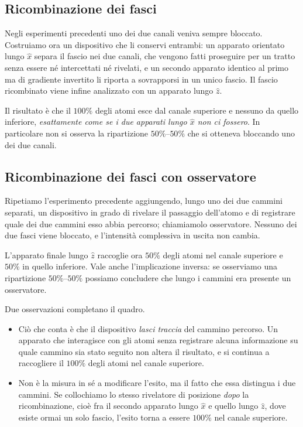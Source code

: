  
\subsection{Ricombinazione dei fasci}
 
Negli esperimenti precedenti uno dei due canali veniva sempre bloccato.
Costruiamo ora un dispositivo che li conservi entrambi: un apparato orientato lungo $\hat{x}$ separa il fascio nei due canali, che vengono fatti proseguire per un tratto senza essere né intercettati né rivelati, e un secondo apparato identico al primo ma di gradiente invertito li riporta a sovrapporsi in un unico fascio. 
Il fascio ricombinato viene infine analizzato con un apparato lungo $\hat{z}$.
 
Il risultato è che il $100\%$ degli atomi esce dal canale superiore e nessuno da quello inferiore, \emph{esattamente come se i due apparati lungo $\hat{x}$ non ci fossero}. 
In particolare non si osserva la ripartizione $50\%$--$50\%$ che si otteneva bloccando uno dei due canali.
 
\subsection{Ricombinazione dei fasci con osservatore}
 
Ripetiamo l'esperimento precedente aggiungendo, lungo uno dei due cammini separati, un dispositivo in grado di rivelare il passaggio dell'atomo e di registrare quale dei due cammini esso abbia percorso; chiamiamolo osservatore. Nessuno dei due fasci viene bloccato, e l'intensità complessiva in uscita non cambia.
 
L'apparato finale lungo $\hat{z}$ raccoglie ora $50\%$ degli atomi nel canale superiore e $50\%$ in quello inferiore. Vale anche l'implicazione inversa: se osserviamo una ripartizione $50\%$--$50\%$ possiamo concludere che lungo i cammini era presente un osservatore.
 
Due osservazioni completano il quadro.
 
\begin{itemize}
    \item Ciò che conta è che il dispositivo \emph{lasci traccia} del cammino percorso. Un apparato che interagisce con gli atomi senza registrare alcuna informazione su quale cammino sia stato seguito non altera il risultato, e si continua a raccogliere il $100\%$ degli atomi nel canale superiore.
 
    \item Non è la misura in sé a modificare l'esito, ma il fatto che essa distingua i due cammini. Se collochiamo lo stesso rivelatore di posizione \emph{dopo} la ricombinazione, cioè fra il secondo apparato lungo $\hat{x}$ e quello lungo $\hat{z}$, dove esiste ormai un solo fascio, l'esito torna a essere $100\%$ nel canale superiore.
\end{itemize}
 
